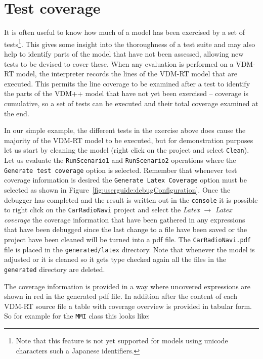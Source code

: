 \section{Test coverage}\label{sec:testcov}

It is often useful to know how much of a model has been exercised by a
set of tests\footnote{Note that this feature is not yet supported for
  models using unicode characters such a Japanese identifiers.}. 
This gives some insight into the thoroughness of a test
suite and may also help to identify parts of the model that have not
been assessed, allowing new tests to be devised to cover these. When
any evaluation is performed on a VDM-RT model, the interpreter records
the lines of the VDM-RT model that are executed. This permits the line
coverage to be examined after a test to identify the parts of the
VDM++ model that have not yet been exercised -- coverage is
cumulative, so a set of tests can be executed and their total coverage
examined at the end.

In our simple example, the different tests in the exercise above does
cause the majority of the VDM-RT model to be executed, but for
demonstration purposes let us start by cleaning the model (right click
on the project and select \texttt{Clean}). Let us evaluate the
\texttt{RunScenario1} and \texttt{RunScenario2} operations where the
\texttt{Generate test coverage} option is selected. 
Remember that whenever test coverage
information is desired the \texttt{Generate Latex Coverage} option
must be selected as shown in Figure~\ref{fig:userguide:debugConfiguration}. 
 Once the debugger
has completed and the result is written out in the \texttt{console} it
is possible to right click on the \texttt{CarRadioNavi} project and
select the \emph{Latex} $ \rightarrow $ \emph{Latex coverage} the
coverage information that have been gathered in any expressions that
have been debugged since the last change to a file have been saved or
the project have been cleaned will be turned into a pdf file. The
\texttt{CarRadioNavi.pdf} file is placed in the
\texttt{generated/latex} directory. Note that whenever the model is
adjusted or it is cleaned so it gets type checked again all the files
in the \texttt{generated} directory are deleted.

The coverage information is provided in a way where uncovered
expressions are shown in red in the generated pdf file. In addition
after the content of each VDM-RT source file a table with coverage
overview is provided in tabular form. So for example for the
\texttt{MMI} class this looks like:

